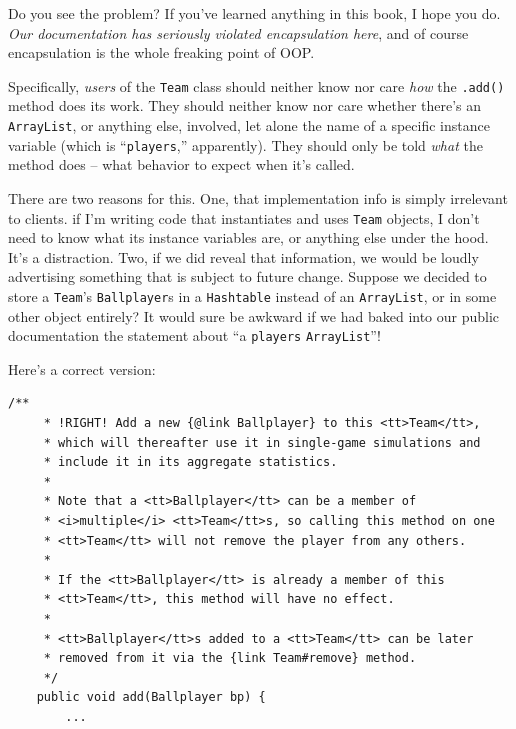 
Do you see the problem? If you've learned anything in this book, I hope you do.
\textit{Our documentation has seriously violated encapsulation here}, and of
course encapsulation is the whole freaking point of OOP.

Specifically, \textit{users} of the \texttt{Team} class should neither know nor
care \textit{how} the \texttt{.add()} method does its work. They should neither
know nor care whether there's an \texttt{ArrayList}, or anything else,
involved, let alone the name of a specific instance variable (which is
``\texttt{players},'' apparently). They should only be told \textit{what} the
method does -- what behavior to expect when it's called.

There are two reasons for this. One, that implementation info is simply
irrelevant to clients. if I'm writing code that instantiates and uses
\texttt{Team} objects, I don't need to know what its instance variables are, or
anything else under the hood. It's a distraction. Two, if we did reveal that
information, we would be loudly advertising something that is subject to future
change. Suppose we decided to store a \texttt{Team}'s \texttt{Ballplayer}s in a
\texttt{Hashtable} instead of an \texttt{ArrayList}, or in some other object
entirely? It would sure be awkward if we had baked into our public
documentation the statement about ``a \texttt{players} \texttt{ArrayList}''!

Here's a correct version:

\vspace{-.15in}
\begin{Verbatim}[fontsize=\scriptsize,samepage=true,frame=single]
    /**
     * !RIGHT! Add a new {@link Ballplayer} to this <tt>Team</tt>,
     * which will thereafter use it in single-game simulations and
     * include it in its aggregate statistics.
     *
     * Note that a <tt>Ballplayer</tt> can be a member of
     * <i>multiple</i> <tt>Team</tt>s, so calling this method on one
     * <tt>Team</tt> will not remove the player from any others.
     *
     * If the <tt>Ballplayer</tt> is already a member of this
     * <tt>Team</tt>, this method will have no effect.
     * 
     * <tt>Ballplayer</tt>s added to a <tt>Team</tt> can be later
     * removed from it via the {link Team#remove} method.
     */
    public void add(Ballplayer bp) {
        ...
\end{Verbatim}


